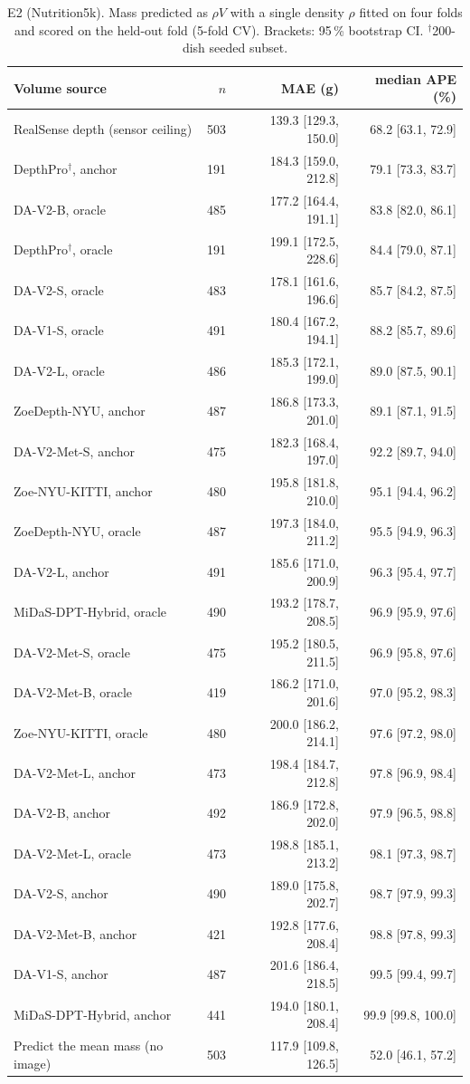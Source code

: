 \begin{table}[t]
\centering
\caption{E2 (Nutrition5k). Mass predicted as $\rho V$ with a single density
$\rho$ fitted on four folds and scored on the held-out fold (5-fold CV).
Brackets: 95\,\% bootstrap CI. $^\dagger$200-dish seeded subset.}
\label{tab:mass}
\scriptsize
\setlength{\tabcolsep}{3pt}
\begin{tabular}{lrrr}
\toprule
Volume source & $n$ & MAE (g) & median APE (\%) \\
\midrule
RealSense depth (sensor ceiling) & 503 & 139.3 [129.3, 150.0] & 68.2 [63.1, 72.9] \\
DepthPro$^\dagger$, anchor & 191 & 184.3 [159.0, 212.8] & 79.1 [73.3, 83.7] \\
DA-V2-B, oracle & 485 & 177.2 [164.4, 191.1] & 83.8 [82.0, 86.1] \\
DepthPro$^\dagger$, oracle & 191 & 199.1 [172.5, 228.6] & 84.4 [79.0, 87.1] \\
DA-V2-S, oracle & 483 & 178.1 [161.6, 196.6] & 85.7 [84.2, 87.5] \\
DA-V1-S, oracle & 491 & 180.4 [167.2, 194.1] & 88.2 [85.7, 89.6] \\
DA-V2-L, oracle & 486 & 185.3 [172.1, 199.0] & 89.0 [87.5, 90.1] \\
ZoeDepth-NYU, anchor & 487 & 186.8 [173.3, 201.0] & 89.1 [87.1, 91.5] \\
DA-V2-Met-S, anchor & 475 & 182.3 [168.4, 197.0] & 92.2 [89.7, 94.0] \\
Zoe-NYU-KITTI, anchor & 480 & 195.8 [181.8, 210.0] & 95.1 [94.4, 96.2] \\
ZoeDepth-NYU, oracle & 487 & 197.3 [184.0, 211.2] & 95.5 [94.9, 96.3] \\
DA-V2-L, anchor & 491 & 185.6 [171.0, 200.9] & 96.3 [95.4, 97.7] \\
MiDaS-DPT-Hybrid, oracle & 490 & 193.2 [178.7, 208.5] & 96.9 [95.9, 97.6] \\
DA-V2-Met-S, oracle & 475 & 195.2 [180.5, 211.5] & 96.9 [95.8, 97.6] \\
DA-V2-Met-B, oracle & 419 & 186.2 [171.0, 201.6] & 97.0 [95.2, 98.3] \\
Zoe-NYU-KITTI, oracle & 480 & 200.0 [186.2, 214.1] & 97.6 [97.2, 98.0] \\
DA-V2-Met-L, anchor & 473 & 198.4 [184.7, 212.8] & 97.8 [96.9, 98.4] \\
DA-V2-B, anchor & 492 & 186.9 [172.8, 202.0] & 97.9 [96.5, 98.8] \\
DA-V2-Met-L, oracle & 473 & 198.8 [185.1, 213.2] & 98.1 [97.3, 98.7] \\
DA-V2-S, anchor & 490 & 189.0 [175.8, 202.7] & 98.7 [97.9, 99.3] \\
DA-V2-Met-B, anchor & 421 & 192.8 [177.6, 208.4] & 98.8 [97.8, 99.3] \\
DA-V1-S, anchor & 487 & 201.6 [186.4, 218.5] & 99.5 [99.4, 99.7] \\
MiDaS-DPT-Hybrid, anchor & 441 & 194.0 [180.1, 208.4] & 99.9 [99.8, 100.0] \\
Predict the mean mass (no image) & 503 & 117.9 [109.8, 126.5] & 52.0 [46.1, 57.2] \\
\bottomrule
\end{tabular}
\end{table}
